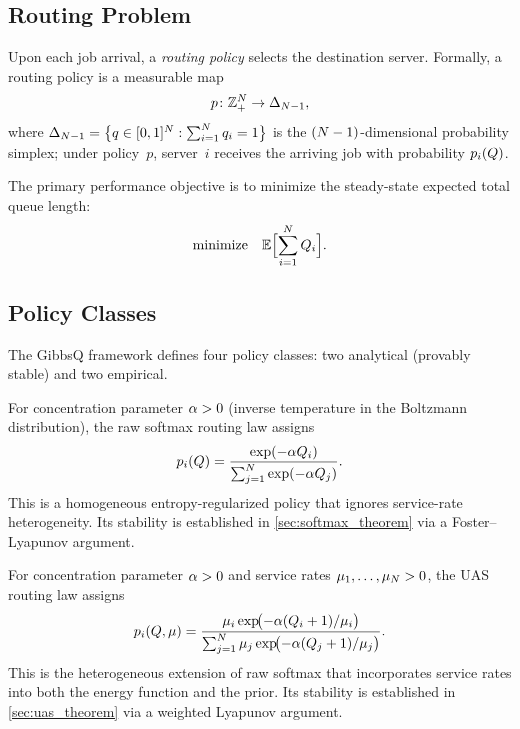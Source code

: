 \subsection{Routing Problem}
\label{sec:model:routing}

Upon each job arrival, a \emph{routing policy} selects the destination server. Formally, a routing policy is a measurable map
\begin{equation}
\label{eq:routing_map}
p \colon \mathbb{Z}_+^N \to \Delta_{N-1},
\end{equation}
where $\Delta_{N-1} = \bigl\{q \in [0,1]^N : \sum_{i=1}^N q_i = 1\bigr\}$ is the $(N-1)$-dimensional probability simplex; under policy~$p$, server~$i$ receives the arriving job with probability $p_{i}(Q)$.

The primary performance objective is to minimize the steady-state expected total queue length:
\begin{equation}
\label{eq:objective}
\text{minimize} \quad \mathbb{E}\Bigl[\sum_{i=1}^{N} Q_{i}\Bigr].
\end{equation}

\subsection{Policy Classes}
\label{sec:model:policies}

The GibbsQ framework defines four policy classes: two analytical (provably stable) and two empirical.

\begin{definition}
\label{def:raw_softmax}
For concentration parameter $\alpha > 0$ (inverse temperature in the Boltzmann distribution), the raw softmax routing law assigns
\begin{equation}
\label{eq:raw_softmax}
p_{i}(Q) = \frac{\exp(-\alpha Q_{i})}{\sum_{j=1}^{N} \exp(-\alpha Q_{j})}.
\end{equation}
This is a homogeneous entropy-regularized policy that ignores service-rate heterogeneity. Its stability is established in \cref{sec:softmax_theorem} via a Foster--Lyapunov argument.
\end{definition}


\begin{definition}
\label{def:uas}
For concentration parameter $\alpha > 0$ and service rates $\mu_1, \dots, \mu_N > 0$, the UAS routing law assigns
\begin{equation}
\label{eq:uas_routing}
p_{i}(Q, \mu) = \frac{\mu_i \exp\!\bigl(-\alpha (Q_{i}+1)/\mu_i\bigr)}{\sum_{j=1}^{N} \mu_j \exp\!\bigl(-\alpha (Q_{j}+1)/\mu_j\bigr)}.
\end{equation}
This is the heterogeneous extension of raw softmax that incorporates service rates into both the energy function and the prior. Its stability is established in \cref{sec:uas_theorem} via a weighted Lyapunov argument.
\end{definition}


